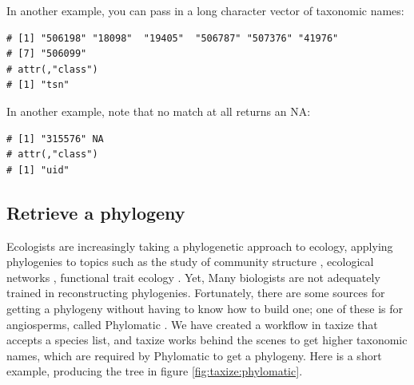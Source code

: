 \begin{sloppypar}
In another example, you can pass in a long character vector of taxonomic names:

\begin{knitrout}
\small

\color{fgcolor}
\begin{kframe}
\begin{alltt}
 \hlkwb{<-} \hlstd{(}\hlstd{,} \hlstd{,}
            \hlstd{,} \hlstd{,}
            \hlstd{,} \hlstd{,}
            \hlstd{)}
\hlstd{(}   \hlstd{=} \hlstd{)}
\end{alltt}
\begin{verbatim}
# [1] "506198" "18098"  "19405"  "506787" "507376" "41976" 
# [7] "506099"
# attr(,"class")
# [1] "tsn"
\end{verbatim}
\end{kframe}
\end{knitrout}

In another example, note that no match at all returns an NA:

\begin{knitrout}
\small

\color{fgcolor}
\begin{kframe}
\begin{alltt}
\hlstd{(} \hlstd{=} \hlstd{(}\hlstd{,} \hlstd{))}
\end{alltt}
\begin{verbatim}
# [1] "315576" NA      
# attr(,"class")
# [1] "uid"
\end{verbatim}
\end{kframe}
\end{knitrout}


\subsection{Retrieve a phylogeny}
Ecologists are increasingly taking a phylogenetic approach to ecology, applying phylogenies to topics such as the study of community structure \citep{webb2002phylogenies}, ecological networks \citep{rafferty2013phylogenetic}, functional trait ecology \citep{poff2006functional}. 
Yet, Many biologists are not adequately trained in reconstructing phylogenies.
Fortunately, there are some sources for getting a phylogeny without having to know how to build one; one of these is for angiosperms, called Phylomatic \citep{webb2005}. 
We have created a workflow in taxize that accepts a species list, and taxize works behind the scenes to get higher taxonomic names, which are required by Phylomatic to get a phylogeny. 
Here is a short example, producing the tree in figure \ref{fig:taxize:phylomatic}.


\end{sloppypar}
